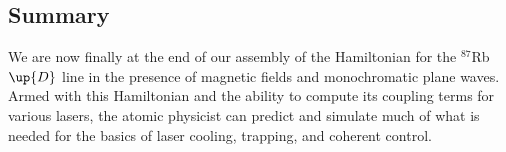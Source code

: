 \subsection{Summary}
We are now finally at the end of our assembly of the Hamiltonian for the $^{87}$Rb $\up{D}$ line in the presence of magnetic fields and monochromatic plane waves. Armed with this Hamiltonian and the ability to compute its coupling terms for various lasers, the atomic physicist can predict and simulate much of what is needed for the basics of laser cooling, trapping, and coherent control.